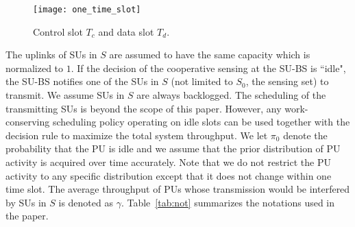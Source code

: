 \documentclass[conference]{IEEEtran}
\begin{document}
\begin{figure}[tb]
    \begin{center}
    \setlength{\unitlength}{1in}
    \texttt{[image: one\_time\_slot]}
    \end{center}
\vspace{-1.2em}
\caption{Control slot $T_c$ and data slot $T_d$.}
\vspace{-1.8em}
\label{fig:slot}
\end{figure}   

The uplinks of SUs in $S$ are assumed to have the same capacity which is normalized to $1$. If the decision of the cooperative sensing at the SU-BS is ``idle", the SU-BS notifies one of the SUs in $S$ (not limited to $S_0$, the sensing set) to transmit. We assume SUs in $S$ are always backlogged. The scheduling of the transmitting SUs is beyond the scope of this paper. However, any work-conserving scheduling policy operating on idle slots can be used together with the decision rule to maximize the total system throughput. We let ${\pi}_0$ denote the probability that the PU is idle and we assume that the prior distribution of PU activity is acquired over time accurately. Note that we do not restrict the PU activity to any specific distribution except that it does not change within one time slot. The average throughput of PUs whose transmission would be interfered by SUs in $S$ is denoted as $\gamma$. Table~\ref{tab:not} summarizes the notations used in the paper.
\end{document}
